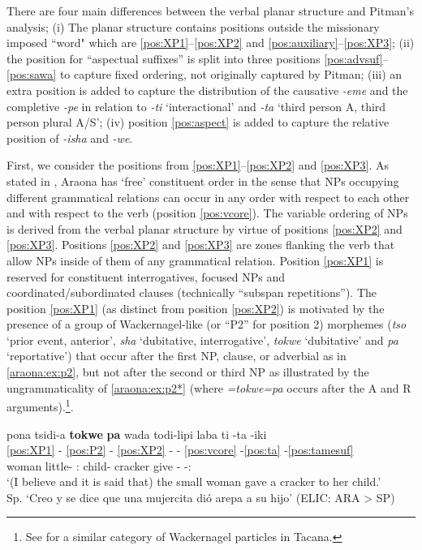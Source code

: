 \documentclass[output=paper,hidelinks]{langscibook}
\begin{document}
There are four main differences between the verbal planar structure and Pitman's analysis; (i) The planar structure contains positions outside the missionary imposed ``word" which are \ref{pos:XP1}--\ref{pos:XP2} and \ref{pos:auxiliary}--\ref{pos:XP3}; (ii) the position for ``aspectual suffixes'' is split into three positions \ref{pos:advsuf}--\ref{pos:sawa} to capture fixed ordering, not originally captured by Pitman; (iii) an extra position is added to capture the distribution of the causative \textit{-eme} and the completive \textit{-pe} in relation to \textit{-ti} `interactional' and \textit{-ta} `third person A, third person plural A/S'; (iv) position \ref{pos:aspect} is added to capture the relative position of \textit{-isha} and \textit{-we}.

First, we consider the positions from \ref{pos:XP1}--\ref{pos:XP2} and \ref{pos:XP3}. As stated in , Araona has `free' constituent order in the sense that NPs occupying different grammatical relations can occur in any order with respect to each other and with respect to the verb (position \ref{pos:vcore}). The variable ordering of NPs is derived from the verbal planar structure by virtue of positions \ref{pos:XP2} and \ref{pos:XP3}. Positions \ref{pos:XP2} and \ref{pos:XP3} are zones flanking the verb that allow NPs inside of them of any grammatical relation. Position \ref{pos:XP1} is reserved for constituent interrogatives, focused NPs and coordinated/subordinated clauses (technically ``subspan repetitions''). The position \ref{pos:XP1} (as distinct from position \ref{pos:XP2}) is motivated by the presence of a group of Wackernagel-like (or ``P2'' for position 2) morphemes (\textit{tso} `prior event, anterior', \textit{sha} `dubitative, interrogative', \textit{tokwe} `dubitative' and \textit{pa} `reportative') that occur after the first NP, clause, or adverbial as in \ref{araona:ex:p2}, but not after the second or third NP as illustrated by the ungrammaticality of \ref{araona:ex:p2*} (where \textit{=tokwe=pa} occurs after the A and R arguments).\footnote{See \citep{Guillaume2016} for a similar category of Wackernagel particles in Tacana.}.

\largerpage
\ea \label{araona:ex:p2}
    \glll pona tsidi-a \textbf{tokwe} \textbf{pa} wada todi-lipi laba ti -ta -iki   \\
    \ref{pos:XP1} - \ref{pos:P2} - \ref{pos:XP2} - - \ref{pos:vcore} -\ref{pos:ta} -\ref{pos:tamesuf} \\
    woman little-\Erg{} \textbf{\Epis{}} \textbf{\Rep{}} \Tsg{}:\Gen{} child-\Dim{} cracker give -\Third\Aarg{} -\Recp{}:\Pst{}   \\
    \glt `(I believe and it is said that) the small woman gave a cracker to her child.' \\ Sp. `Creo y se dice que una mujercita dió arepa a su hijo' \hfill (ELIC: ARA > SP)
\z 
\end{document}
